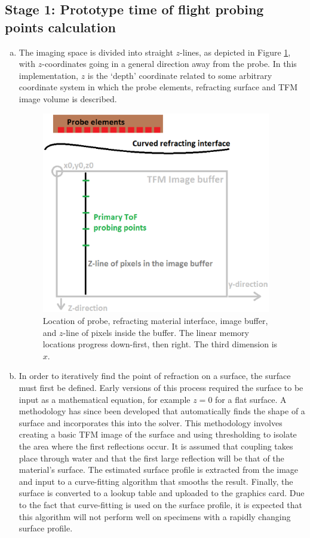 \subsection{Stage 1: Prototype time of flight probing points calculation}\label{sec:phase1}
\begin{enumerate}[a)]
\item The imaging space is divided into straight $z$-lines, as depicted in Figure \ref{fig:cuetfm_geo_zline}\cite{dziewierz_design_2013}, with $z$-coordinates going in a general direction away from the probe. In this implementation, $z$ is the `depth' coordinate related to some arbitrary coordinate system in which the probe elements, refracting surface and TFM image volume is described.

\begin{figure}[htb]
\centering
		\includegraphics[width=100mm]{zline.eps}
		\caption{Location of probe, refracting material interface, image buffer, and $z$-line of pixels inside the buffer. The linear memory locations progress down-first, then right. The third dimension is $x$.}
		\label{fig:cuetfm_geo_zline}
\end{figure}

\item In order to iteratively find the point of refraction on a surface, the surface must first be defined. Early versions of this process required the surface to be input as a mathematical equation, for example $z = 0$ for a flat surface. A methodology has since been developed that automatically finds the shape of a surface and incorporates this into the solver\cite{mcgilp_inspection_2015}. This methodology involves creating a basic TFM image of the surface and using thresholding to isolate the area where the first reflections occur. It is assumed that coupling takes place through water and that the first large reflection will be that of the material's surface. The estimated surface profile is extracted from the image and input to a curve-fitting algorithm that smooths the result. Finally, the surface is converted to a lookup table and uploaded to the graphics card. Due to the fact that curve-fitting is used on the surface profile, it is expected that this algorithm will not perform well on specimens with a rapidly changing surface profile.


\end{enumerate}
